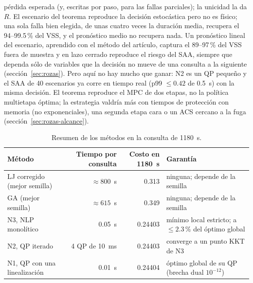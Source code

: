 \begin{enumerate}[label=\textbf{Q\arabic*.}]
        pérdida esperada (y, escritas por paso, para las fallas parciales); la unicidad la da $R$.
        El escenario del teorema reproduce la decisión estocástica pero no es físico; una sola
        falla bien elegida, de unas cuatro veces la duración media, recupera el 94--99.5\,\% del
        VSS, y el pronóstico medio no recupera nada. Un pronóstico lineal del escenario, aprendido
        con el método del artículo, captura el 89--97\,\% del VSS fuera de muestra y en lazo
        cerrado reproduce el riesgo del SAA, siempre que dependa sólo de variables que la decisión
        no mueve de una consulta a la siguiente (sección~\ref{sec:rozas}). Pero aquí no hay
        mucho que ganar: N2 es un QP pequeño y el SAA de 40 escenarios ya corre en tiempo real
        (p99 $\le0.42$ de 0.5~s) con la misma decisión. El teorema reproduce el MPC de dos etapas,
        no la política multietapa óptima; la estrategia valdría más con tiempos de protección con
        memoria (no exponenciales), una segunda etapa cara o un ACS cercano a la fuga
        (sección~\ref{sec:rozas-alcance}).
\end{enumerate}

\begin{table}[H]\centering\small
\begin{tabularx}{\linewidth}{@{}l r r Y@{}}\toprule
Método & Tiempo por consulta & Costo en 1180~s & Garantía\\\midrule
LJ corregido (mejor semilla) & $\approx800$~s & 0.313 & ninguna; depende de la semilla\\
GA (mejor semilla) & $\approx615$~s & 0.349 & ninguna; depende de la semilla\\
N3, NLP monolítico & 0.05~s & 0.24403 & mínimo local estricto; a $\le2.3$\,\% del óptimo global\\
N2, QP iterado & 4 QP de 10~ms & 0.24403 & converge a un punto KKT de N3\\
N1, QP con una linealización & 0.01~s & 0.24404 & óptimo global de su QP (brecha dual $10^{-12}$)\\\bottomrule
\end{tabularx}
\caption{Resumen de los métodos en la consulta de 1180~s.}
\end{table}

